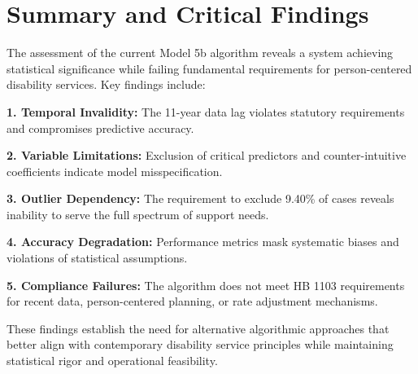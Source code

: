 \section{Summary and Critical Findings}

The assessment of the current Model 5b algorithm reveals a system achieving statistical significance while failing fundamental requirements for person-centered disability services. Key findings include:

\textbf{1. Temporal Invalidity:} The 11-year data lag violates statutory requirements and compromises predictive accuracy.

\textbf{2. Variable Limitations:} Exclusion of critical predictors and counter-intuitive coefficients indicate model misspecification.

\textbf{3. Outlier Dependency:} The requirement to exclude 9.40\% of cases reveals inability to serve the full spectrum of support needs.

\textbf{4. Accuracy Degradation:} Performance metrics mask systematic biases and violations of statistical assumptions.

\textbf{5. Compliance Failures:} The algorithm does not meet HB 1103 requirements for recent data, person-centered planning, or rate adjustment mechanisms.

These findings establish the need for alternative algorithmic approaches that better align with contemporary disability service principles while maintaining statistical rigor and operational feasibility.